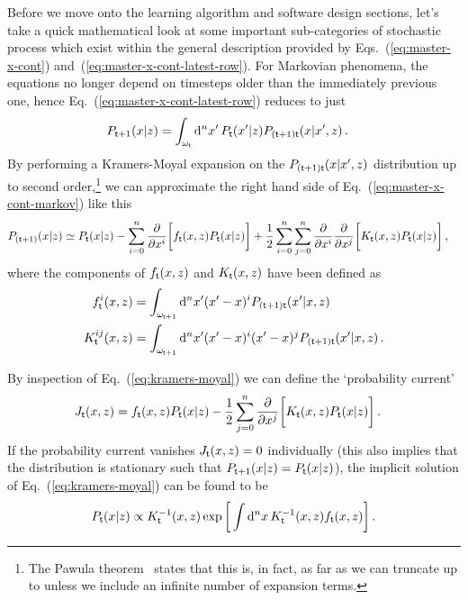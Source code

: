 Before we move onto the learning algorithm and software design sections, let's take a quick mathematical look at some important sub-categories of stochastic process which exist within the general description provided by Eqs.~(\ref{eq:master-x-cont}) and~(\ref{eq:master-x-cont-latest-row}). For Markovian phenomena, the equations no longer depend on timesteps older than the immediately previous one, hence Eq.~(\ref{eq:master-x-cont-latest-row}) reduces to just
\begin{align}
P_{{\sf t}+1}(x\vert z) &= \int_{\omega_{\sf t}}{\rm d}^nx' \, P_{\sf t}(x'\vert z) P_{({\sf t}+1){\sf t}}(x\vert x',z) \label{eq:master-x-cont-markov} \,.
\end{align}
By performing a Kramers-Moyal expansion on the $P_{({\sf t}+1){\sf t}}(x\vert x',z)$ distribution up to second order,\footnote{The Pawula theorem~\cite{pawula1967generalizations} states that this is, in fact, as far as we can truncate up to unless we include an infinite number of expansion terms.} we can approximate the right hand side of Eq.~(\ref{eq:master-x-cont-markov}) like this 
\begin{align}
P_{({\sf t}+1)}(x\vert z) &\simeq P_{{\sf t}}(x\vert z) - \sum_{i=0}^n\frac{\partial}{\partial x^i}\bigg[ f_{{\sf t}}(x,z)P_{{\sf t}}(x\vert z)\bigg] + \frac{1}{2}\sum_{i=0}^n\sum_{j=0}^n\frac{\partial}{\partial x^i}\frac{\partial}{\partial x^j}\bigg[ K_{{\sf t}}(x,z)P_{{\sf t}}(x\vert z)\bigg] \label{eq:kramers-moyal} \,,
\end{align}
where the components of $f_{{\sf t}}(x,z)$ and $K_{{\sf t}}(x,z)$ have been defined as
\begin{align}
f^i_{{\sf t}}(x,z) &= \int_{\omega_{{\sf t}+1}} {\rm d}^nx' (x'-x)^iP_{({\sf t}+1){\sf t}}(x'\vert x,z) \\
K^{ij}_{{\sf t}}(x,z) &= \int_{\omega_{{\sf t}+1}} {\rm d}^nx' (x'-x)^i(x'-x)^jP_{({\sf t}+1){\sf t}}(x'\vert x,z)\,.
\end{align}

By inspection of Eq.~(\ref{eq:kramers-moyal}) we can define the `probability current'
\begin{align}
J_{{\sf t}}(x,z) &= f_{{\sf t}}(x,z)P_{{\sf t}}(x\vert z) - \frac{1}{2}\sum_{j=0}^{n}\frac{\partial}{\partial x^j}\bigg[ K_{{\sf t}}(x,z)P_{{\sf t}}(x\vert z)\bigg] \,.
\end{align}
If the probability current vanishes $J_{{\sf t}}(x,z)=0$ individually (this also implies that the distribution is stationary such that $P_{{\sf t}+1}(x\vert z)=P_{{\sf t}}(x\vert z)$), the implicit solution of Eq.~(\ref{eq:kramers-moyal}) can be found to be
\begin{align}
P_{{\sf t}}(x\vert z) \propto K_{{\sf t}}^{-1}(x,z)\exp \bigg[ \int {\rm d}^nx\, K^{-1}_{{\sf t}}(x,z)f_{{\sf t}}(x,z)\bigg] \,.
\end{align}

